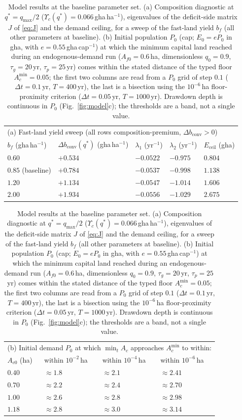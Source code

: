 \documentclass[preprint,12pt,authoryear]{elsarticle}
\newcommand{\dconv}{\Delta b_{\mathrm{conv}}}
\newcommand{\Ups}{\Upsilon_c}
\newcommand{\Eceil}{E_{\mathrm{ceil}}}
\newcommand{\Acmin}{A_c^{\min}}
\begin{document}
\begin{table}[!htbp]
\centering\small
\caption{Model results at the baseline parameter set. (a) Composition diagnostic at $q^*=q_{\max}/2$ ($\Ups(q^*)=0.066$\,gha\,ha$^{-1}$), eigenvalues of the deficit-side matrix $J$ of \eqref{eq:J} and the demand ceiling, for a sweep of the fast-land yield $b_f$ (all other parameters at baseline). (b) Initial population $P_0$ (cap; $E_0=eP_0$ in gha, with $e=0.55$\,gha\,cap$^{-1}$) at which the minimum capital land reached during an endogenous-demand run ($A_{f0}=0.6$\,ha, dimensionless $q_0=0.9$, $\tau_g=20$\,yr, $\tau_p=25$\,yr) comes within the stated distance of the typed floor $\Acmin=0.05$; the first two columns are read from a $P_0$ grid of step $0.1$ ($\Delta t=0.1$\,yr, $T=400$\,yr), the last is a bisection using the $10^{-6}$\,ha floor-proximity criterion ($\Delta t=0.05$\,yr, $T=1000$\,yr). Drawdown depth is continuous in $P_0$ (Fig.~\ref{fig:model}c); the thresholds are a band, not a single value.}
\label{tab:model}
\begin{tabular}{l l l l l}
\toprule
\multicolumn{5}{l}{(a) Fast-land yield sweep (all rows composition-premium, $\dconv>0$)}\\
$b_f$ (gha\,ha$^{-1}$) & $\dconv(q^*)$ (gha\,ha$^{-1}$) & $\lambda_1$ (yr$^{-1}$) & $\lambda_2$ (yr$^{-1}$) & $\Eceil$ (gha) \\
\midrule
$0.60$ & $+0.534$ & $-0.0522$ & $-0.975$ & $0.804$ \\
$0.85$ (baseline) & $+0.784$ & $-0.0537$ & $-0.998$ & $1.138$ \\
$1.20$ & $+1.134$ & $-0.0547$ & $-1.014$ & $1.606$ \\
$2.00$ & $+1.934$ & $-0.0556$ & $-1.029$ & $2.675$ \\
\bottomrule
\end{tabular}

\medskip
\begin{tabular}{l l l l}
\toprule
\multicolumn{4}{l}{(b) Initial demand $P_0$ at which $\min_tA_c$ approaches $\Acmin$ to within:}\\
$A_{c0}$ (ha) & within $10^{-2}$\,ha & within $10^{-4}$\,ha & within $10^{-6}$\,ha \\
\midrule
$0.40$ & $\approx1.8$ & $\approx2.1$ & $\approx2.41$ \\
$0.70$ & $\approx2.2$ & $\approx2.4$ & $\approx2.70$ \\
$1.00$ & $\approx2.6$ & $\approx2.8$ & $\approx2.98$ \\
$1.18$ & $\approx2.8$ & $\approx3.0$ & $\approx3.14$ \\
\bottomrule
\end{tabular}
\end{table}
\end{document}
